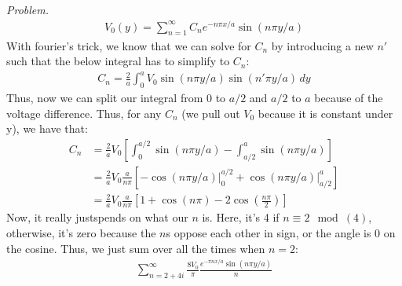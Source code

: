 \documentclass[10pt,oneside]{book}
\newcommand{\gspc}{\vspace{0.13cm}} %
\newenvironment{problem}[1]
  {\vspace{-0.1cm}\begin{tcolorbox}[problembox]
   \textit{Problem. }#1}
  {\end{tcolorbox}\gspc}
\newcommand{\cpr}[1]{\left(#1\right)}
\begin{document}
\begin{problem}
  \begin{align}
    V_0(y) = \sum_{n=1}^{\infty}C_n e^{-n\pi x/a}\sin(n\pi y /a)
  \end{align}
  With fourier's trick, we know that we can solve for $C_n$ by introducing a new $n'$ such that the below integral has to simplify to $C_n$:
  \begin{align}
    C_n = \frac{2}a\int_0^aV_0\sin(n\pi y /a)\sin(n'\pi y/a)\,dy
  \end{align}
  Thus, now we can split our integral from $0$ to $a/2$ and $a/2$ to $a$ because of the voltage difference. Thus, for any $C_n$ (we pull out $V_0$ because it is constant under y), we have that:
  \begin{align*}
    C_n &= \frac{2}aV_0\left[\int_0^{a/2}\sin(n\pi y/a) - \int_{a/2}^a \sin(n\pi y/a)\right]\\
    &= \frac{2}aV_0\frac{a}{n\pi}\left[-\cos(n\pi y/a)\Big|_0^{a/2} + \cos(n\pi y/a)\Big|_{a/2}^a\right]\\
    &= \frac{2}aV_0\frac{a}{n\pi}\left[1 + \cos(n\pi) - 2\cos\cpr{\frac{n\pi}2}\right]
  \end{align*}
  Now, it really justspends on what our $n$ is. Here, it's 4 if $n \equiv 2\mod(4)$, otherwise, it's zero because the $n$s oppose each other in sign, or the angle is 0 on the cosine. Thus, we just sum over all the times when $n = 2$:
  \begin{align*}
    \sum_{n=2+4i}^\infty\frac{8V_0}{\pi}\frac{e^{-\pi nx/a}\sin(n\pi y /a)}n
  \end{align*}
\end{problem}
\end{document}
